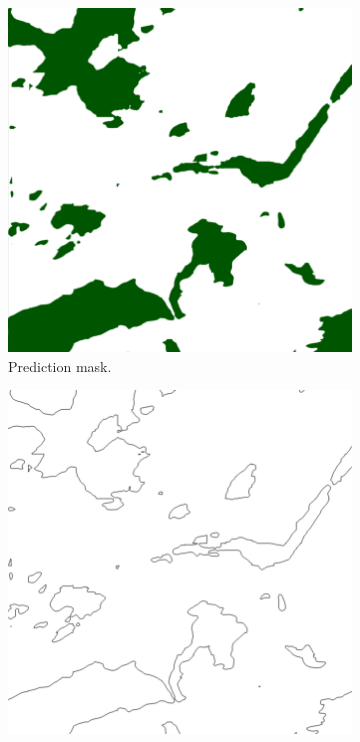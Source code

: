  \begin{figure}[H]
\centering
\begin{subfigure}{0.49\textwidth}
\centering
\includegraphics[width = \textwidth]{IMAGENES/IMG21-Contour1.png}
\caption{Prediction mask.}
\label{fig:left}
\end{subfigure}
\begin{subfigure}{0.49\textwidth}
\centering
\includegraphics[width = \textwidth]{IMAGENES/IMG21-Contour2.png}

\end{subfigure}
\end{figure}
